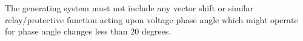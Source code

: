 The generating system must not include any vector shift or similar relay/protective function acting upon voltage phase angle which might operate for phase angle changes less than 20 degrees.

